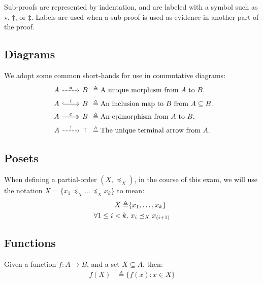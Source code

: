 Sub-proofs are represented by indentation, and are labeled with a symbol such as $\star$, $\dagger$, or $\ddagger$. Labels are used when a sub-proof is used as evidence in another part of the proof.

\subsection{Diagrams}

We adopt some common short-hands for use in commutative diagrams:
\begin{align*}
  \begin{tikzcd}[ampersand replacement=\&]
    A \arrow[r, dashed, "u"] \& B
  \end{tikzcd}
   & \triangleq
  \text{A unique morphism from $A$ to $B$.}\\
  \begin{tikzcd}[ampersand replacement=\&]
    A \arrow[r, hook, "i"] \& B
  \end{tikzcd}
   & \triangleq
  \text{An inclusion map to $B$ from $A\subseteq B$.}\\
  \begin{tikzcd}[ampersand replacement=\&]
    A \arrow[r, two heads, "e"] \& B
  \end{tikzcd}
   & \triangleq
  \text{An epimorphism from $A$ to $B$.}\\
  \begin{tikzcd}[ampersand replacement=\&]
    A \arrow[r, dashed, "!"] \& \top
  \end{tikzcd}
   & \triangleq
  \text{The unique terminal arrow from $A$.}\\
\end{align*}

\subsection{Posets}

When defining a partial-order $(X,\preceq_X)$, in the course of this exam, we will use the notation $X = \{x_1\preceq_X\ldots\preceq_X x_k\}$ to mean:
\begin{align*}
  X \triangleq & \{x_1,\ldots,x_k\} \\
  \forall1\leq i < k \ldotp &~x_i\preceq_X x_{(i+1)}
\end{align*}

\subsection{Functions}

Given a function $f : A\to B$, and a set $X\subseteq A$, then:
\begin{align*}
  f(X) & \triangleq \{f(x) : x\in X\}
\end{align*}
